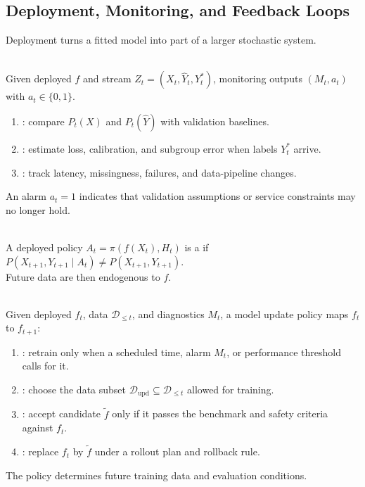 \subsection{Deployment, Monitoring, and Feedback Loops}

Deployment turns a fitted model into part of a larger stochastic system.

\begin{definition} \label{def:sl-monitoring} \\
Given deployed $f$ and stream $Z_t=(X_t,\widehat Y_t,Y_t^\ast)$, monitoring outputs $(M_t,a_t)$ with $a_t\in\{0,1\}$.
\begin{enumerate}[label=(\roman*)]
\setlength{\itemsep}{0pt}
\item {}: compare $P_t(X)$ and $P_t(\widehat Y)$ with validation baselines.
\item {}: estimate loss, calibration, and subgroup error when labels $Y_t^\ast$ arrive.
\item {}: track latency, missingness, failures, and data-pipeline changes.
\end{enumerate}
An alarm $a_t=1$ indicates that validation assumptions or service constraints may no longer hold.
\end{definition}

\begin{definition} \label{def:sl-feedback-loop} \\
A deployed policy $A_t=\pi(f(X_t),H_t)$ is a  if $P(X_{t+1},Y_{t+1}\mid A_t)\ne P(X_{t+1},Y_{t+1})$.\\
Future data are then endogenous to $f$.
\end{definition}

\begin{method} \label{method:sl-model-update-policy} \\
Given deployed $f_t$, data $\mathcal{D}_{\le t}$, and diagnostics $M_t$, a model update policy maps $f_t$ to $f_{t+1}$:
\begin{enumerate}[label=(\roman*)]
\setlength{\itemsep}{0pt}
\item {}: retrain only when a scheduled time, alarm $M_t$, or performance threshold calls for it.
\item {}: choose the data subset $\mathcal{D}_{\mathrm{upd}}\subseteq\mathcal{D}_{\le t}$ allowed for training.
\item {}: accept candidate $\widetilde f$ only if it passes the benchmark and safety criteria against $f_t$.
\item {}: replace $f_t$ by $\widetilde f$ under a rollout plan and rollback rule.
\end{enumerate}
The policy determines future training data and evaluation conditions.
\end{method}

